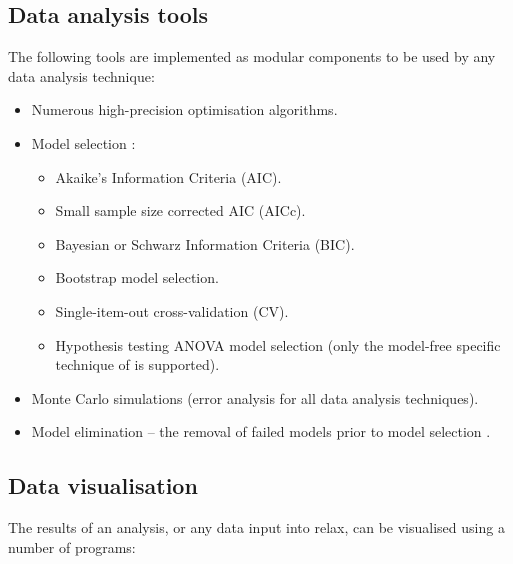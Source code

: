 
\subsection{Data analysis tools}

The following tools are implemented as modular components to be used by any data analysis technique:

\begin{itemize}
\item Numerous high-precision optimisation algorithms.
\item Model selection \citep{dAuvergneGooley03, Chen04}:
    \begin{itemize}
    \item Akaike's Information Criteria (AIC).
    \item Small sample size corrected AIC (AICc).
    \item Bayesian or Schwarz Information Criteria (BIC).
    \item Bootstrap model selection.
    \item Single-item-out cross-validation (CV).
    \item Hypothesis testing ANOVA model selection (only the model-free specific technique of \citet{Mandel95} is supported).
    \end{itemize}
\item Monte Carlo simulations (error analysis for all data analysis techniques).
\item Model elimination -- the removal of failed models prior to model selection \citep{dAuvergneGooley06}.
\end{itemize}



\subsection{Data visualisation}

The results of an analysis, or any data input into relax, can be visualised using a number of programs:

